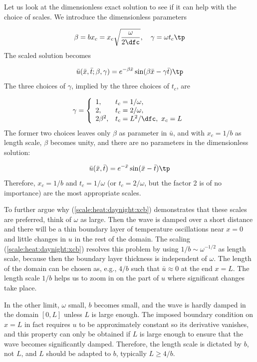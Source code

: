 \documentclass[graybox,envcountchap,sectrefs,final]{svmonodo}
\begin{document}
Let us look at the dimensionless exact solution to see if it can help
with the choice of scales.  We introduce the dimensionless parameters

\[ \beta = bx_c = x_c\sqrt{\frac{\omega}{2\dfc}},\quad
\gamma = \omega t_c\tp\]
The scaled solution becomes

\[ \bar u(\bar x, \bar t; \beta,\gamma) = e^{-\beta\bar x}\sin(\beta\bar x - \gamma\bar t)\tp\]
The three choices of $\gamma$, implied by the three choices of $t_c$, are

\begin{equation}
\gamma = \left\lbrace\begin{array}{ll}
1, & t_c=1/\omega,\\ 
2, & t_c = 2/\omega,\\ 
2\beta^2, & t_c = L^2/\dfc,\ x_c=L
\end{array}\right.
\label{scale:heat:daynight:gamma3}
\end{equation}
The former two choices leaves only $\beta$ as parameter in $\bar u$,
and with $x_c=1/b$ as length scale, $\beta$ becomes unity, and there
are no parameters in the dimensionless solution:

\begin{equation}
\bar u(\bar x, \bar t) = e^{-\bar x}\sin(\bar x - \bar t)\tp
\label{scale:heat:daynight:xcb}
\end{equation}
Therefore, $x_c=1/b$ and $t_c=1/\omega$ (or $t_c=2/\omega$, but the
factor 2 is of no importance) are the most appropriate scales.

To further argue why (\ref{scale:heat:daynight:xcb}) demonstrates
that these scales are
preferred, think of
$\omega$ as large. Then the wave is damped over a short
distance and there will be a thin boundary layer of temperature
oscillations near $x=0$ and little changes in $u$ in the rest of
the domain. The scaling (\ref{scale:heat:daynight:xcb}) resolves
this problem by using $1/b \sim \omega^{-1/2}$ as length scale,
because then the boundary layer thickness is independent of
$\omega$. The length of the domain can be chosen as, e.g., $4/b$
such that $\bar u\approx 0$ at the end $x=L$. The length scale $1/b$
helps us to zoom in on the part of $u$ where significant changes
take place.

In the other limit, $\omega$ small, $b$ becomes small, and the wave is
hardly damped in the domain $[0,L]$ unless $L$ is large enough.  The
imposed boundary condition on $x=L$ in fact requires $u$ to be
approximately constant so its derivative vanishes, and this property
can only be obtained if $L$ is large enough to ensure that the wave
becomes significantly damped.  Therefore, the length scale is dictated
by $b$, not $L$, and $L$ should be adapted to $b$, typically $L\geq
4/b$.
\end{document}
